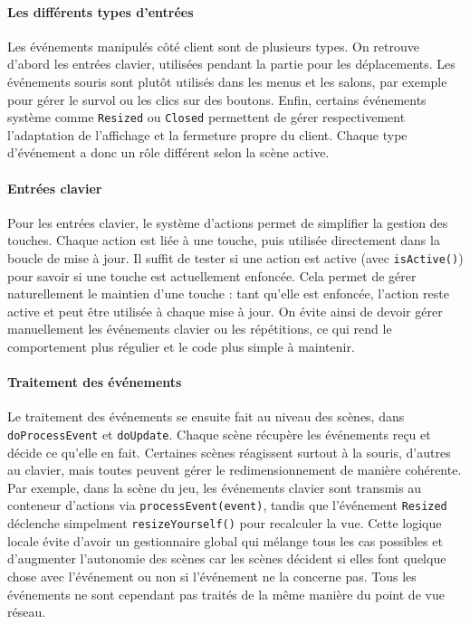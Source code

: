 \documentclass[a4paper, 11pt]{article}
\begin{document}
\paragraph{Les différents types d'entrées}

Les événements manipulés côté client sont de plusieurs types.
On retrouve d’abord les entrées clavier, utilisées pendant la partie pour les déplacements.
Les événements souris sont plutôt utilisés dans les menus et les salons, par exemple pour gérer le survol ou les clics sur des boutons.
Enfin, certains événements système comme \texttt{Resized} ou \texttt{Closed} permettent de gérer respectivement l’adaptation de l’affichage et la fermeture propre du client.
Chaque type d’événement a donc un rôle différent selon la scène active.

\paragraph{Entrées clavier}

Pour les entrées clavier, le système d’actions permet de simplifier la gestion des touches.
Chaque action est liée à une touche, puis utilisée directement dans la boucle de mise à jour.
Il suffit de tester si une action est active (avec \texttt{isActive()}) pour savoir si une touche est actuellement enfoncée.
Cela permet de gérer naturellement le maintien d’une touche : tant qu’elle est enfoncée, l’action reste active et peut être utilisée à chaque mise à jour.
On évite ainsi de devoir gérer manuellement les événements clavier ou les répétitions, ce qui rend le comportement plus régulier et le code plus simple à maintenir.

\paragraph{Traitement des événements}

Le traitement des événements se ensuite fait au niveau des scènes, dans \texttt{doProcessEvent} et \texttt{doUpdate}. 
Chaque scène récupère les événements reçu et décide ce qu’elle en fait. 
Certaines scènes réagissent surtout à la souris, d’autres au clavier, mais toutes peuvent gérer le redimensionnement de manière cohérente.
Par exemple, dans la scène du jeu, les événements clavier sont transmis au conteneur d’actions via \texttt{processEvent(event)}, tandis que l’événement \texttt{Resized} déclenche simpelment \texttt{resizeYourself()} pour recalculer la vue. 
Cette logique locale évite d’avoir un gestionnaire global qui mélange tous les cas possibles et d'augmenter l'autonomie des scènes car les scènes décident si elles font quelque chose avec l'événement ou non si l'événement ne la concerne pas.
Tous les événements ne sont cependant pas traités de la même manière du point de vue réseau.
\end{document}
